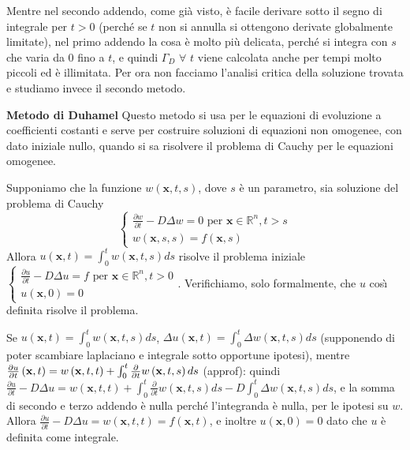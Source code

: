 \documentclass{article}
\begin{document}
Mentre nel secondo addendo, come gi\`{a} visto, \`{e} facile derivare sotto
il segno di integrale per $t>0$ (perch\'{e} se $t$ non si annulla si
ottengono derivate globalmente limitate), nel primo addendo la cosa \`{e}
molto pi\`{u} delicata, perch\'{e} si integra con $s$ che varia da $0$ fino
a $t$, e quindi $\Gamma _{D}$ $\forall $ $t$ viene calcolata anche per tempi
molto piccoli ed \`{e} illimitata. Per ora non facciamo l'analisi critica
della soluzione trovata e studiamo invece il secondo metodo.

\textbf{Metodo di Duhamel }Questo metodo si usa per le equazioni di
evoluzione a coefficienti costanti e serve per costruire soluzioni di
equazioni non omogenee, con dato iniziale nullo, quando si sa risolvere il
problema di Cauchy per le equazioni omogenee.

Supponiamo che la funzione $w\left( \mathbf{x},t,s\right) $, dove $s$ \`{e}
un parametro, sia soluzione del problema di Cauchy 
\begin{equation*}
\left\{ 
\begin{array}{c}
\frac{\partial w}{\partial t}-D\Delta w=0\text{ per }\mathbf{x}\in 
\mathbb{R}
^{n},t>s \\ 
w\left( \mathbf{x},s,s\right) =f\left( \mathbf{x},s\right)%
\end{array}%
\right.  
\end{equation*}
Allora $u\left( \mathbf{x},t\right) =\int_{0}^{t}w\left( \mathbf{x%
},t,s\right) ds$ risolve il problema iniziale $\left\{ 
\begin{array}{c}
\frac{\partial u}{\partial t}-D\Delta u=f\text{ per }\mathbf{x}\in 
\mathbb{R}
^{n},t>0 \\ 
u\left( \mathbf{x},0\right) =0%
\end{array}%
\right. $. Verifichiamo, solo formalmente, che $u$ cos\`{\i} definita
risolve il problema.

Se $u\left( \mathbf{x},t\right) =\int_{0}^{t}w\left( \mathbf{x},t,s\right)
ds $, $\Delta u\left( \mathbf{x},t\right) =\int_{0}^{t}\Delta w\left( 
\mathbf{x},t,s\right) ds$ (supponendo di poter scambiare laplaciano e
integrale sotto opportune ipotesi), mentre $\frac{\partial u}{\partial t}%
\left( \mathbf{x},t\right) =w\left( \mathbf{x},t,t\right) +\int_{0}^{t}\frac{%
\partial }{\partial t}w\left( \mathbf{x},t,s\right) ds$ (approf): quindi $%
\frac{\partial u}{\partial t}-D\Delta u=w\left( \mathbf{x},t,t\right)
+\int_{0}^{t}\frac{\partial }{\partial t}w\left( \mathbf{x},t,s\right)
ds-D\int_{0}^{t}\Delta w\left( \mathbf{x},t,s\right) ds$, e la somma di
secondo e terzo addendo \`{e} nulla perch\'{e} l'integranda \`{e} nulla, per
le ipotesi su $w$. Allora $\frac{\partial u}{\partial t}-D\Delta u=w\left( 
\mathbf{x},t,t\right) =f\left( \mathbf{x},t\right) $, e inoltre $u\left( 
\mathbf{x},0\right) =0$ dato che $u$ \`{e} definita come integrale.
\end{document}
